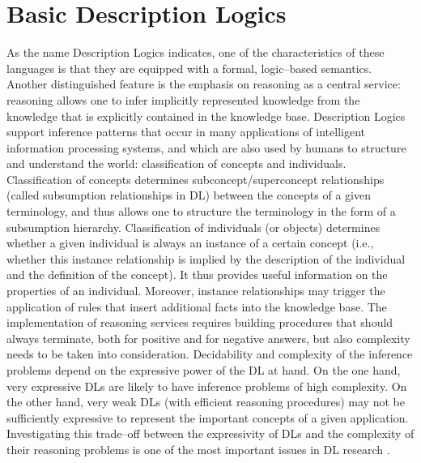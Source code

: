 \documentclass[a4paper, 11pt, oneside]{duthesis}
\begin{document}
\section{Basic Description Logics}
As the name Description Logics indicates, one of the characteristics of these languages is that they are equipped with a formal, logic--based semantics.
Another distinguished feature is the emphasis on reasoning as a central service: reasoning allows one to infer implicitly represented knowledge from the knowledge that is explicitly contained in the knowledge base.
Description Logics support inference patterns that occur in many applications of intelligent information processing systems, and which are also used by humans to structure and understand the world: classification of concepts and individuals.
Classification of concepts determines subconcept/superconcept relationships (called subsumption relationships in DL) between the concepts of a given terminology, and thus allows one to structure the terminology in the form of a subsumption hierarchy.
Classification of individuals (or objects) determines whether a given individual is always an instance of a certain concept (i.e., whether this instance relationship is implied by the description of the individual and the definition of the concept).
It thus provides useful information on the properties of an individual.
Moreover, instance relationships may trigger the application of rules that insert additional facts into the knowledge base.
The implementation of reasoning services requires building procedures that should always terminate, both for positive and for negative answers, but also complexity needs to be taken into consideration.
Decidability and complexity of the inference problems depend on the expressive power of the DL at hand.
On the one hand, very expressive DLs are likely to have inference problems of high complexity.
On the other hand, very weak DLs (with efficient reasoning procedures) may not be sufficiently expressive to represent the important concepts of a given application.
Investigating this trade--off between the expressivity of DLs and the complexity of their reasoning problems is one of the most important issues in DL research
\cite{Baader:2003:BDL:885746.885749}.


\newpage

\end{document}
